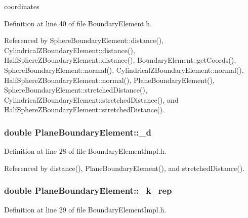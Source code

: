 coordinates 



Definition at line 40 of file Boundary\+Element.\+h.



Referenced by Sphere\+Boundary\+Element\+::distance(), Cylindrical\+Z\+Boundary\+Element\+::distance(), Half\+Sphere\+Z\+Boundary\+Element\+::distance(), Boundary\+Element\+::get\+Coords(), Sphere\+Boundary\+Element\+::normal(), Cylindrical\+Z\+Boundary\+Element\+::normal(), Half\+Sphere\+Z\+Boundary\+Element\+::normal(), Plane\+Boundary\+Element(), Sphere\+Boundary\+Element\+::stretched\+Distance(), Cylindrical\+Z\+Boundary\+Element\+::stretched\+Distance(), and Half\+Sphere\+Z\+Boundary\+Element\+::stretched\+Distance().

\hypertarget{classPlaneBoundaryElement_a01c1e54fda120dba72c8cea1b3025ab7}{
\subsubsection[{\+\_\+d}]{\setlength{\rightskip}{0pt plus 5cm}double Plane\+Boundary\+Element\+::\+\_\+d\hspace{0.3cm}{\ttfamily [private]}}}\label{classPlaneBoundaryElement_a01c1e54fda120dba72c8cea1b3025ab7}


Definition at line 28 of file Boundary\+Element\+Impl.\+h.



Referenced by distance(), Plane\+Boundary\+Element(), and stretched\+Distance().

\hypertarget{classPlaneBoundaryElement_aaa66079ea34844957907160081ab3059}{
\subsubsection[{\+\_\+k\+\_\+rep}]{\setlength{\rightskip}{0pt plus 5cm}double Plane\+Boundary\+Element\+::\+\_\+k\+\_\+rep\hspace{0.3cm}{\ttfamily [private]}}}\label{classPlaneBoundaryElement_aaa66079ea34844957907160081ab3059}


Definition at line 29 of file Boundary\+Element\+Impl.\+h.



